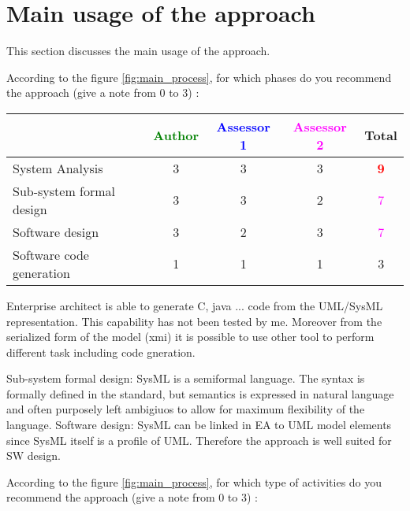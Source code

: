 \section{Main usage of the approach}
\label{main_usage}
This section discusses the main usage of the approach.

According to the figure \ref{fig:main_process}, for which phases do you recommend the approach (give a note from 0 to  3) :

\begin{tabular}{|l | c | c | c | c|}
\hline
& \textcolor{green}{Author} & \textcolor{blue}{Assessor 1} & \textcolor{magenta}{Assessor 2} & Total \\
\hline 
System Analysis & 3      & 3     & 3     & \textcolor{red}{\textbf{9}} \\
\hline
Sub-system formal design & 3     & 3     & 2     & \textcolor{magenta}{7} \\
\hline
Software design & 3     & 2     & 3     & \textcolor{magenta}{7} \\
\hline
Software code generation & 1     & 1     & 1     & 3     \\
\hline
\end{tabular}
\begin{author_comment}
Enterprise architect is able to generate C, java ... code from the UML/SysML
representation. This capability has not been tested by me. Moreover
from the serialized form of the model (xmi) it is possible to use
other tool to perform different task including code gneration.
\end{author_comment}
\begin{assessor2}
Sub-system formal design: SysML is a semiformal language. The syntax is formally defined in the standard, but semantics is expressed in natural language and often purposely left ambigiuos to allow for maximum flexibility of the language.
Software design: SysML can be linked in EA to UML model elements since SysML itself is a profile of UML. Therefore the approach is well suited for SW design.
\end{assessor2}

According to the figure \ref{fig:main_process}, for which type of activities do you recommend the approach (give a note from 0 to  3) :

